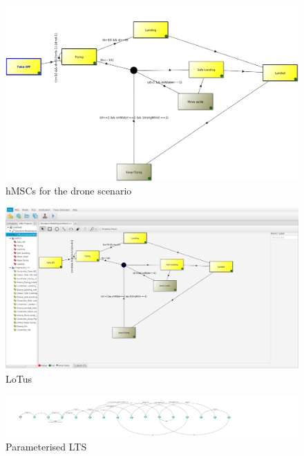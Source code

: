 \begin{figure}
 \includegraphics[width=\columnwidth]{figures/1-hMSC-Drone.png}
    \caption{hMSCs for the drone scenario}
    \label{fig:drone_msc}
    \vspace*{-0.25cm}
\end{figure}

\begin{figure}
 \includegraphics[width=\columnwidth]{figures/2-LoTuS.png}
    \caption{LoTus}
    \label{fig:lotus}
    \vspace*{-0.25cm}
\end{figure}

\begin{figure}
 \includegraphics[width=\columnwidth]{figures/3-parameterized-LTS.png}
    \caption{Parameterised LTS}
    \label{fig:pLTS}
    \vspace*{-0.25cm}
\end{figure}


